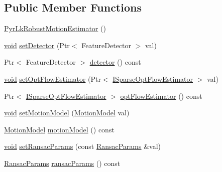 \subsection*{Public Member Functions}
\begin{DoxyCompactItemize}
\item 
\hyperlink{classcv_1_1videostab_1_1PyrLkRobustMotionEstimator_a3a0c9637ff7bc34dd869e8f2b0652a98}{Pyr\-Lk\-Robust\-Motion\-Estimator} ()
\item 
\hyperlink{legacy_8hpp_a8bb47f092d473522721002c86c13b94e}{void} \hyperlink{classcv_1_1videostab_1_1PyrLkRobustMotionEstimator_a5de2c42678cc8fc435823ab0b8fe2030}{set\-Detector} (Ptr$<$ Feature\-Detector $>$ val)
\item 
Ptr$<$ Feature\-Detector $>$ \hyperlink{classcv_1_1videostab_1_1PyrLkRobustMotionEstimator_a2babf73c3b95186f381800796d4175d3}{detector} () const 
\item 
\hyperlink{legacy_8hpp_a8bb47f092d473522721002c86c13b94e}{void} \hyperlink{classcv_1_1videostab_1_1PyrLkRobustMotionEstimator_a9dfb81700e479acd391751004321b79b}{set\-Opt\-Flow\-Estimator} (Ptr$<$ \hyperlink{classcv_1_1videostab_1_1ISparseOptFlowEstimator}{I\-Sparse\-Opt\-Flow\-Estimator} $>$ val)
\item 
Ptr$<$ \hyperlink{classcv_1_1videostab_1_1ISparseOptFlowEstimator}{I\-Sparse\-Opt\-Flow\-Estimator} $>$ \hyperlink{classcv_1_1videostab_1_1PyrLkRobustMotionEstimator_abb0f4888ac7f1bdbf7b0c66d3130ad94}{opt\-Flow\-Estimator} () const 
\item 
\hyperlink{legacy_8hpp_a8bb47f092d473522721002c86c13b94e}{void} \hyperlink{classcv_1_1videostab_1_1PyrLkRobustMotionEstimator_ac206563521fea9b0db5af1a326beabc1}{set\-Motion\-Model} (\hyperlink{namespacecv_1_1videostab_ac61e59db30b7d13983885d3ad3116ce1}{Motion\-Model} val)
\item 
\hyperlink{namespacecv_1_1videostab_ac61e59db30b7d13983885d3ad3116ce1}{Motion\-Model} \hyperlink{classcv_1_1videostab_1_1PyrLkRobustMotionEstimator_a148a7b51d7a7786d1b1b65d6f8471dbb}{motion\-Model} () const 
\item 
\hyperlink{legacy_8hpp_a8bb47f092d473522721002c86c13b94e}{void} \hyperlink{classcv_1_1videostab_1_1PyrLkRobustMotionEstimator_a1a66e831a6ce17a4acd3326e9d7908f0}{set\-Ransac\-Params} (const \hyperlink{structcv_1_1videostab_1_1RansacParams}{Ransac\-Params} \&val)
\item 
\hyperlink{structcv_1_1videostab_1_1RansacParams}{Ransac\-Params} \hyperlink{classcv_1_1videostab_1_1PyrLkRobustMotionEstimator_afea00515a0e1cd5b9e2780e17d9b59f1}{ransac\-Params} () const 

\end{DoxyCompactItemize}
